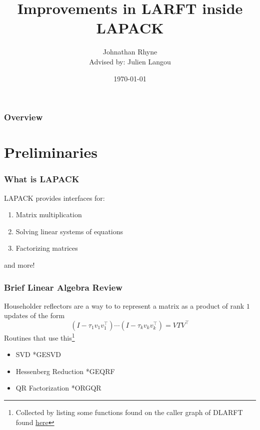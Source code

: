 \documentclass[12pt]{beamer}
\title{Improvements in LARFT inside LAPACK}
\author{Johnathan Rhyne\\Advised by: Julien Langou}
\institute{University of Colorado Denver}
\date{\today}
\begin{document}
    \begin{frame}
        \titlepage
    \end{frame}
    \begin{frame}
        \frametitle{Overview}
        \tableofcontents
    \end{frame}
    \section{Preliminaries}
    \begin{frame}
        \frametitle{What is LAPACK}
        LAPACK provides interfaces for:
        \begin{enumerate}
            \item Matrix multiplication
            \item Solving linear systems of equations
            \item Factorizing matrices
        \end{enumerate}
        and more!
    \end{frame}
    \begin{frame}
        \frametitle{Brief Linear Algebra Review}
        Householder reflectors are a way to to represent a matrix as a product of rank $1$ updates of the form
        $$
            \left(I - \tau_1 v_1v_1^\top\right)\cdots\left(I - \tau_k v_kv_k^\top\right) = VTV^\top
        $$
        Routines that use this\footnote{Collected by listing some functions found on the caller graph of DLARFT found \textcolor{blue}{\href{https://netlib.org/lapack/explore-html//d7/d0d/group__larft_ga20e5a4f351b3ca7d30078547e55884f5_ga20e5a4f351b3ca7d30078547e55884f5_icgraph_org.svg}{here}}}
        \begin{itemize}
            \item SVD *GESVD
            \item Hessenberg Reduction *GEQRF
            \item QR Factorization *ORGQR
        \end{itemize}
    \end{frame}
\end{document}
